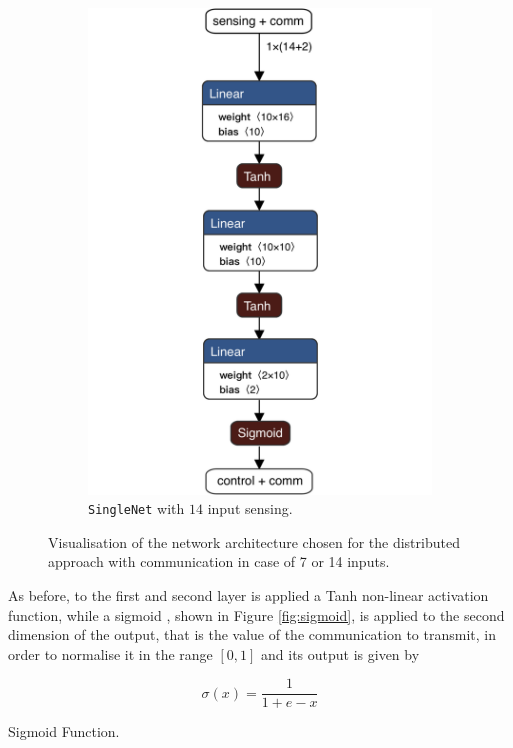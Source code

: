 \begin{figure}[!htb]
\begin{subfigure}[h]{0.495\textwidth}
		\includegraphics[width=.8\textwidth]{contents/images/task1distributed_allcomm@4x}
		\caption{\texttt{SingleNet} with $14$ input sensing.}
	\end{subfigure}
	\caption[Network architectures for the distributed approach with 
	communication.]{Visualisation of the network architecture chosen for the 
	distributed approach with communication in case of 7 or 14 inputs.}
	\label{fig:singlenetcomm1}
\end{figure}

As before, to the first and second layer is applied a Tanh non-linear 
activation function, while a sigmoid \cite[see][]{han1995influence}, shown in 
Figure \ref{fig:sigmoid}, is applied to the second dimension of the output, 
that is the value of the communication to transmit, in order to normalise it in 
the range $[0, 1]$ and its output is given by
\begin{Equation}[H]
	\centering
	\begin{equation}
	\sigma(x)= \frac{1}{1 + e - x}
	\end{equation}
	\caption{Sigmoid Function.}
	\label{eq:sigmoid}
\end{Equation}

